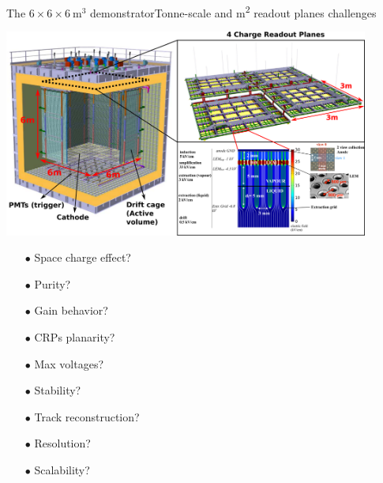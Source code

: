 \documentclass[10pt]{beamer}
\begin{document}
    \begin{frame}{The \texorpdfstring{$6 \times 6 \times \SI{6}{\meter\cubed}$}{666}
    		demonstrator}{Tonne-scale and \si{\meter\squared} readout planes challenges}
    	\begin{scriptsize}
    			\includegraphics[width=0.9\textwidth]{figures/666/666_full.png}\\
    			\vfill
    			\begin{minipage}{0.32\textwidth}
    				\begin{itemize}
    					\item[$\bullet$] Space charge effect?
    					\item[$\bullet$] Purity?
    					\item[$\bullet$] Gain behavior?
    				\end{itemize}
    			\end{minipage}\hfill
    			\begin{minipage}{0.32\textwidth}
    				\begin{itemize}
    					\item[$\bullet$]CRPs planarity?
    					\item[$\bullet$] Max voltages?
    					\item[$\bullet$] Stability?
    				\end{itemize}
	    		\end{minipage}\hfill
	    		\begin{minipage}{0.32\textwidth}
	    			\begin{itemize}
	    				\item[$\bullet$] Track reconstruction?
	    				\item[$\bullet$] Resolution?
	    				\item[$\bullet$] Scalability?
	    			\end{itemize}
	    		\end{minipage}
    	\end{scriptsize} 
    \end{frame}
    
\end{document}
